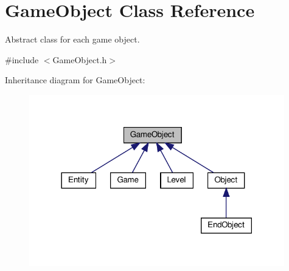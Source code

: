 \hypertarget{classGameObject}{}\section{Game\+Object Class Reference}
\label{classGameObject}


Abstract class for each game object.  




{\ttfamily \#include $<$Game\+Object.\+h$>$}



Inheritance diagram for Game\+Object\+:
\nopagebreak
\begin{figure}[H]
\begin{center}
\leavevmode
\includegraphics[width=314pt]{classGameObject__inherit__graph}
\end{center}
\end{figure}
